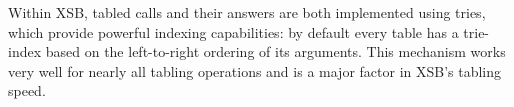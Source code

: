 \begin{description}
\begin{description}




Within XSB, tabled calls and their answers are both implemented using
tries, which provide powerful indexing capabilities: by default every
table has a trie-index based on the left-to-right ordering of its
arguments.  This mechanism works very well for nearly all tabling
operations and is a major factor in XSB's tabling speed.


\end{description}
\end{description}
